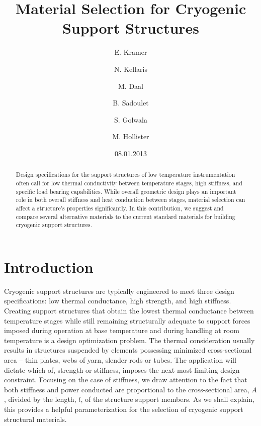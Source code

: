 \documentclass[final]{svjour2}
\begin{document}
\newcommand{\hdblarrow}{H\makebox[0.9ex][l]{$\downdownarrows$}-}
\title{Material Selection for Cryogenic Support Structures}

\author{E. Kramer \and N. Kellaris  \and M. Daal  \and B. Sadoulet \and S. Golwala \and M. Hollister}


\date{08.01.2013}

\maketitle

\begin{abstract}

Design specifications for the support structures of low temperature instrumentation often call for low thermal conductivity between temperature stages, high stiffness, and specific load bearing capabilities.  While overall geometric design plays an important role in both overall stiffness and heat conduction between stages, material selection can affect a structure's properties significantly.  In this contribution, we suggest and compare several alternative materials to the current standard materials for building cryogenic support structures.


\end{abstract}

\section{Introduction}
Cryogenic support structures are typically engineered to meet three design specifications: low thermal conductance, high strength, and high stiffness. Creating support structures that obtain the lowest thermal conductance between temperature stages while still remaining structurally adequate to support forces imposed during operation at base temperature and during handling at room temperature is a design optimization problem. The thermal consideration usually results in structures suspended by elements possessing minimized cross-sectional area -- thin plates, webs of yarn, slender rods or tubes. The application will dictate which of, strength or stiffness, imposes the next most limiting design constraint. Focusing on the case of stiffness, we draw attention to the fact that both stiffness and power conducted are proportional to the cross-sectional area, $A$, divided by the length, $l$, of the structure support members.\cite{Hastings1993} As we shall explain, this provides a helpful parameterization for the selection of cryogenic support structural materials.
\end{document}
